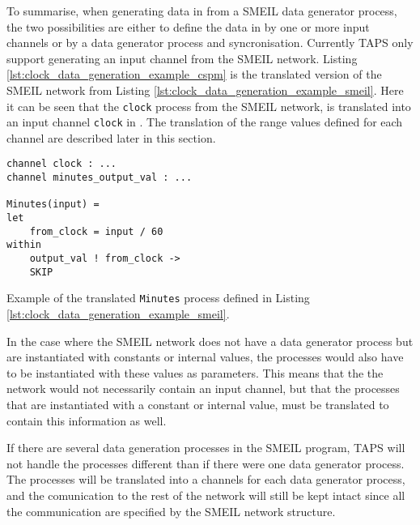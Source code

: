 To summarise, when generating data in \cspm{} from a SMEIL data generator process, the two possibilities are either to define the data in \cspm by one or more input channels or by a data generator process and syncronisation.
Currently TAPS only support generating an input channel from the SMEIL network.
Listing \ref{lst:clock_data_generation_example_cspm} is the translated version of the SMEIL network from Listing \ref{lst:clock_data_generation_example_smeil}. Here it can be seen that the \texttt{clock} process from the SMEIL network, is translated into an input channel \texttt{clock} in \cspm{}.
The translation of the range values defined for each channel are described later in this section.
\begin{listing}
\begin{verbatim}
channel clock : ...
channel minutes_output_val : ...

Minutes(input) =
let
    from_clock = input / 60
within
    output_val ! from_clock ->
    SKIP

\end{verbatim}
\caption{Example of the translated \texttt{Minutes} process defined in Listing \ref{lst:clock_data_generation_example_smeil}.}
\label{lst:clock_data_generation_example_cspm}
\end{listing}
In the case where the SMEIL network does not have a data generator process but are instantiated with constants or internal values, the \cspm processes would also have to be instantiated with these values as parameters. This means that the the \cspm{} network would not necessarily contain an input channel, but that the processes that are instantiated with a constant or internal value, must be translated to contain this information as well.

If there are several data generation processes in the SMEIL program, TAPS will not handle the processes different than if there were one data generator process. The processes will be translated into a \cspm channels for each data generator process, and the comunication to the rest of the network will still be kept intact since all the communication are specified by the SMEIL network structure.



